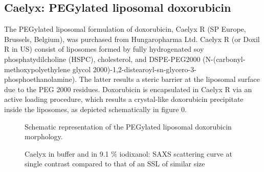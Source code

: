 \subsection{Caelyx: PEGylated liposomal doxorubicin}
The PEGylated liposomal formulation of doxorubicin, Caelyx R (SP Europe, Brussels, Belgium), was purchased from Hungaropharma Ltd. Caelyx R (or Doxil R in US) consist of liposomes formed by fully hydrogenated soy phosphatydilcholine (HSPC), cholesterol, and DSPE-PEG2000 (N-(carbonyl-methoxypolyethylene glycol 2000)-1,2-distearoyl-sn-glycero-3-phosphoethanolamine). The latter results a steric barrier at the liposomal surface due to the PEG 2000 residues. Doxorubicin is encapsulated in Caelyx R via an active loading procedure, which results a crystal-like doxorubicin precipitate inside the liposomes, as depicted schematically in figure 0. 

\begin{figure}
	\centering
		\caption{ Schematic representation of the PEGylated liposomal doxorubicin morphology.}
\end{figure}

\begin{figure}
	\centering
		
		\caption{Caelyx in buffer and in 9.1 $\%$ iodixanol: SAXS scattering curve at single contrast compared to that of an SSL of similar size}
		\label{fig:CaelyxIodixanolSingleContrast}
\end{figure}

